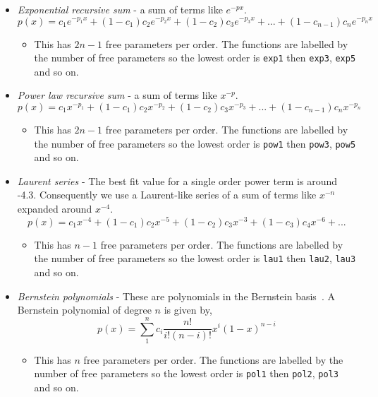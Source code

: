 \begin{itemize}
  \item \textit{Exponential recursive sum} - a sum of terms like $e^{-px}$.
    \begin{equation}
      p(x) = c_{1}e^{-p_{1}x} + (1-c_{1})c_{2}e^{-p_{2}x} + (1-c_{2})c_{3}e^{-p_{3}x} + ... + (1-c_{n-1})c_{n}e^{-p_{n}x}
    \end{equation}
    \begin{itemize}
      \item This has $2n-1$ free parameters per order. The functions are labelled by the number of free parameters so the lowest order is \texttt{exp1} then \texttt{exp3}, \texttt{exp5} and so on.
    \end{itemize}

  \item \textit{Power law recursive sum} - a sum of terms like $x^{-p}$.
    \begin{equation}
      p(x) = c_{1}x^{-p_{1}} + (1-c_{1})c_{2}x^{-p_{2}} + (1-c_{2})c_{3}x^{-p_{3}} + ... + (1-c_{n-1})c_{n}x^{-p_{n}}
    \end{equation}
    \begin{itemize}
      \item This has $2n-1$ free parameters per order. The functions are labelled by the number of free parameters so the lowest order is \texttt{pow1} then \texttt{pow3}, \texttt{pow5} and so on.
    \end{itemize}

  \item \textit{Laurent series} - The best fit value for a single order power term is around -4.3. Consequently we use a Laurent-like series of a sum of terms like $x^{-n}$ expanded around $x^{-4}$.
    \begin{equation}
      p(x) = c_{1}x^{-4} + (1-c_{1})c_{2}x^{-5} + (1-c_{2})c_{3}x^{-3} + (1-c_{3})c_{4}x^{-6} + ...
    \end{equation}
    \begin{itemize}
      \item This has $n-1$ free parameters per order. The functions are labelled by the number of free parameters so the lowest order is \texttt{lau1} then \texttt{lau2}, \texttt{lau3} and so on.
    \end{itemize}

  \item \textit{Bernstein polynomials} - These are polynomials in the Bernstein basis~\cite{bernsteins1,bernsteins2}. A Bernstein polynomial of degree $n$ is given by,
  \begin{equation}
    p(x) = \displaystyle\sum_{1}^{n}c_{i}\frac{n!}{i!(n-i)!}x^{i}(1-x)^{n-i}
    \label{eq:bernsteins}
  \end{equation}
  \begin{itemize}
    \item This has $n$ free parameters per order. The functions are labelled by the number of free parameters so the lowest order is \texttt{pol1} then \texttt{pol2}, \texttt{pol3} and so on.
  \end{itemize}
\end{itemize}

